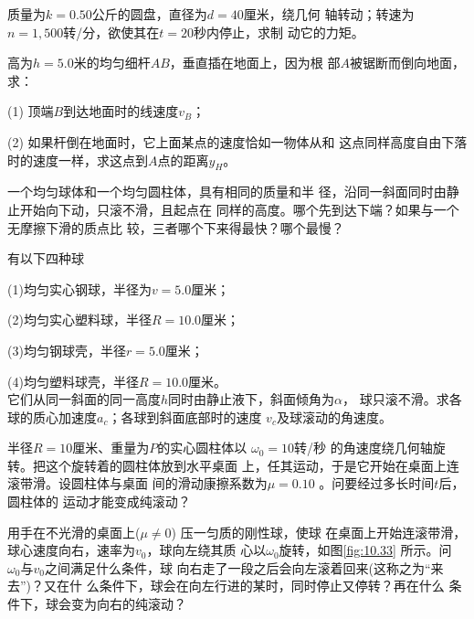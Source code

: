 \begin{exercises}
\exercise 质量为$ k = 0 . 5 0$公斤的圆盘，直径为$ d = 4 0 $厘米，绕几何
轴转动；转速为$ n = 1,500 $转/分，欲使其在$ t = 2 0 $秒内停止，求制
动它的力矩。

\exercise 高为$ h = 5 . 0 $米的均匀细杆$ AB $，垂直插在地面上，因为根
部$ A $被锯断而倒向地面，求：

(1) 顶端$ B $到达地面时的线速度$ v_B $；

(2) 如果杆倒在地面时，它上面某点的速度恰如一物体从和
这点同样高度自由下落时的速度一样，求这点到$ A $点的距离$ y_H $。

\exercise 一个均匀球体和一个均匀圆柱体，具有相同的质量和半
径，沿同一斜面同时由静止开始向下动，只滚不滑，且起点在
同样的高度。哪个先到达下端？如果与一个无摩擦下滑的质点比
较，三者哪个下来得最快？哪个最慢？

\exercise 有以下四种球

(1)均匀实心钢球，半径为$ v = 5 . 0 $厘米；

(2)均匀实心塑料球，半径$ R = 1 0 . 0 $厘米；

(3)均匀钢球壳，半径$ r = 5 . 0 $厘米；

(4)均匀塑料球壳，半径$ R = 1 0 . 0 $厘米。\\
它们从同一斜面的同一高度$ h $同时由静止液下，斜面倾角为$ \alpha $，
球只滚不滑。求各球的质心加速度$ a _ { c } $；各球到斜面底部时的速度
$ v _ { c } $及球滚动的角速度。

\exercise 半径$ R = 1 0 $厘米、重量为$ P $的实心圆柱体以 $ \omega _ { 0 } = 1 0 $转/秒
的角速度绕几何轴旋转。把这个旋转着的圆柱体放到水平桌面
上，任其运动，于是它开始在桌面上连滚带滑。设圆柱体与桌面
间的滑动康擦系数为$ \mu = 0 . 1 0 $ 。问要经过多长时间$ t $后，圆柱体的
运动才能变成纯滚动？

\exercise 用手在不光滑的桌面上($ \mu \ne 0 $) 压一匀质的刚性球，使球
在桌面上开始连滚带滑，球心速度向右，速率为$ v _ { 0 } $，球向左绕其质
心以$ \omega _ { 0 } $旋转，如图\ref{fig:10.33} 所示。问 $ \omega _ { 0 } $与$ v _ { 0 } $之间满足什么条件，球
向右走了一段之后会向左滚着回来(这称之为“来去”)？又在什
么条件下，球会在向左行进的某时，同时停止又停转？再在什么
条件下，球会变为向右的纯滚动？


\end{exercises}
